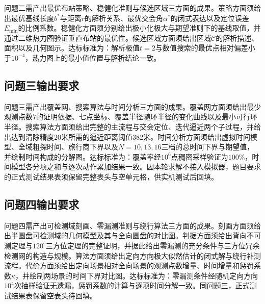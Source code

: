 \documentclass[12pt,a4paper]{ctexart}
\begin{document}
问题二需产出最优布站策略、稳健化准则与候选区域三方面的成果。策略方面须给出最优基线长度$b^{\ast}$与距离$r$的解析关系、最优交会角$\alpha^{\ast}$的闭式表达以及定位误差$E_{\min}$的比例系数。稳健化方面须分别给出极小化极大与期望准则下的基线取值，并通过二维热力图验证垂直布站的最优性。候选区域方面须给出区域$\mathcal{C}$的解析描述、面积以及几何图示。达标标准为：解析极值$t=2$与数值搜索的最优点相对偏差小于$10^{-4}$，热力图上的最小值位置与解析结论一致。

\subsection{问题三输出要求}

问题三需产出覆盖网、搜索算法与时间分析三方面的成果。覆盖网方面须给出最少观测点数$7$的证明依据、七点坐标、覆盖半径随环半径的变化曲线以及最小可行环半径。搜索算法方面须给出完整的主流程与交会定位、迭代逼近两个子过程，并给出达到清除精度$20$米所需的逼近距离阈值$382$米。时间分析方面须给出虚拟时间模型、全域粗探时间、旅行商下界以及$N=10,13,16$三档的总时间下界与期望值，并绘制时间构成的分解图。达标标准为：覆盖率经$10^6$点稠密采样验证为$100\%$，时间模型各分项之和与逐次动作累加结果一致。因本轮求解不接入模拟器，题目要求的正式测试结果表须保留完整表头与空单元格，供实机测试后回填。

\subsection{问题四输出要求}

问题四需产出可检测域刻画、零漏测准则与绕行算法三方面的成果。刻画方面须给出半圆盘可检测域的几何模型及其与全向圆盘的对比图。判据方面须给出背向不可测定理与$120^\circ$三方位定理的完整证明，并据此给出零漏测的充分条件与三方位冗余检测网的构造与规模。算法方面须给出定向方向极大似然估计的闭式解与绕行补测流程。代价方面须给出定向场景相对全向场景的观测点数增量、时间增量和惩罚系数$\kappa$，并绘制两场景的时间下界对比图。达标标准为：零漏测条件经随机定向方向$10^4$次抽样验证无遗漏，惩罚系数的计算与逐项时间分解一致。同问题三，正式测试结果表保留空表头待回填。
\end{document}
